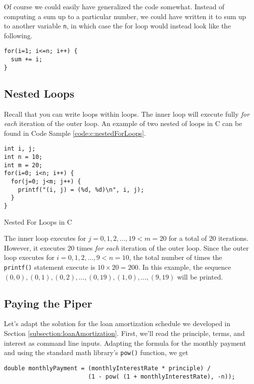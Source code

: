 Of course we could easily have generalized the code somewhat.  Instead of computing
a sum up to a particular number, we could have written it to sum up to another
variable \texttt{n}, in which case the for loop would instead look like the
following.

\begin{verbatim}
for(i=1; i<=n; i++) {
  sum += i;
}
\end{verbatim}

\subsection{Nested Loops}

Recall that you can write loops within loops.  The inner loop will execute fully 
\emph{for each} iteration of the outer loop.  An example of two nested of
loops in C can be found in Code Sample \ref{code:c:nestedForLoops}.

\begin{listing}[H]
\begin{verbatim}
int i, j;
int n = 10;
int m = 20;
for(i=0; i<n; i++) {
  for(j=0; j<m; j++) {
    printf("(i, j) = (%d, %d)\n", i, j);
  }
}
\end{verbatim}
  \caption{Nested For Loops in C}
  \label{code:c:nestedForLoops}
\end{listing}

The inner loop executes for $j = 0, 1, 2, \ldots, 19 < m = 20$ for a total
of 20 iterations.  However, it executes 20 times \emph{for each} iteration of
the outer loop.  Since the outer loop executes for $i = 0, 1, 2, \ldots, 9 < n = 10$, 
the total number of times the \texttt{printf()} statement execute is
$10 \times 20 = 200$.  In this example, the sequence $(0, 0), (0, 1), (0, 2), \ldots, (0,19), (1, 0), \ldots, (9, 19)$
will be printed.

\subsection{Paying the Piper}

Let's adapt the solution for the loan amortization schedule we developed in 
Section \ref{subsection:loanAmortization}.  First, we'll read the principle, 
terms, and interest as command line inputs.  Adapting the formula for the 
monthly payment and using the standard
math library's \texttt{pow()} function, we get

\begin{verbatim}
double monthlyPayment = (monthlyInterestRate * principle) / 
                        (1 - pow( (1 + monthlyInterestRate), -n));
\end{verbatim}

